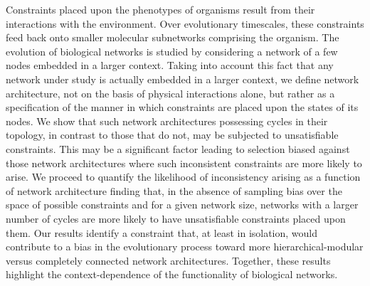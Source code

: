 Constraints placed upon the phenotypes of organisms result from their interactions with the environment.  Over evolutionary timescales, these constraints feed back onto smaller molecular subnetworks comprising the organism. The evolution of biological networks is studied by considering a network of a few nodes embedded in a larger context. Taking into account this fact that any network under study is actually embedded in a larger context, we define network architecture, not on the basis of physical interactions alone, but rather as a specification of the manner in which constraints are placed upon the states of its nodes. We show that such network architectures possessing cycles in their topology, in contrast to those that do not, may be subjected to unsatisfiable constraints. This may be a significant factor leading to selection biased against those network architectures where such inconsistent constraints are more likely to arise. We proceed to quantify the likelihood of inconsistency arising as a function of network architecture finding that, in the absence of sampling bias over the space of possible constraints and for a given network size, networks with a larger number of cycles are more likely to have unsatisfiable constraints placed upon them. Our results identify a constraint that, at least in isolation, would contribute to a bias in the evolutionary process toward more hierarchical-modular versus completely connected network architectures. Together, these results highlight the context-dependence of the functionality of biological networks.

